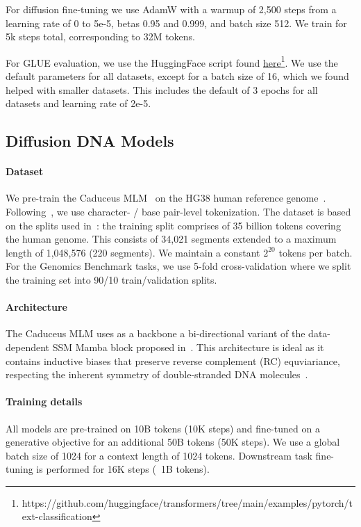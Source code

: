 \documentclass{article} %
\begin{document}
{\begin{appendices}
For diffusion fine-tuning we use AdamW with a warmup of 2,500 steps from a learning rate of 0 to 5e-5, betas 0.95 and 0.999, and batch size 512. We train for 5k steps total, corresponding to 32M tokens.

For GLUE evaluation, we use the HuggingFace script found \href{https://github.com/huggingface/transformers/tree/main/examples/pytorch/text-classification}{here}\footnote{https://github.com/huggingface/transformers/tree/main/examples/pytorch/text-classification}. We use the default parameters for all datasets, except for a batch size of 16, which we found helped with smaller datasets. This includes the default of 3 epochs for all datasets and learning rate of 2e-5.

\subsection{Diffusion DNA Models}
\paragraph{Dataset}
We pre-train the Caduceus MLM~\citep{schiff2024caduceus} on the HG38 human reference genome~\citep{hg38}. Following~\citet{schiff2024caduceus}, we use character- / base pair-level tokenization. The dataset is based on the splits used in~\citet{avsec2021effective}: the training split comprises of 35 billion tokens covering the human genome. This consists of 34,021 segments extended to a maximum length of 1,048,576 (220 segments). We maintain a constant $2^{20}$ tokens per batch. For the Genomics Benchmark tasks, we use 5-fold cross-validation where we split the training set into 90/10 train/validation splits.

\paragraph{Architecture}
\label{apepndix:diffusion-dna-setup}
The Caduceus MLM uses as a backbone a bi-directional variant of the data-dependent SSM Mamba block proposed in~\citet{gu2021efficiently}. This architecture is ideal as it contains inductive biases that preserve reverse complement (RC) equviariance, respecting the inherent symmetry of double-stranded DNA molecules~\citep{mallet2021reverse, schiff2024caduceus, zhou2022towards}.

\paragraph{Training details}
All models are pre-trained on 10B tokens (10K steps) and fine-tuned on a generative objective for an additional 50B tokens (50K steps). We use a global batch size of 1024 for a context length of 1024 tokens. Downstream task fine-tuning is performed for 16K steps (~1B tokens).


\end{appendices}}
\end{document}
